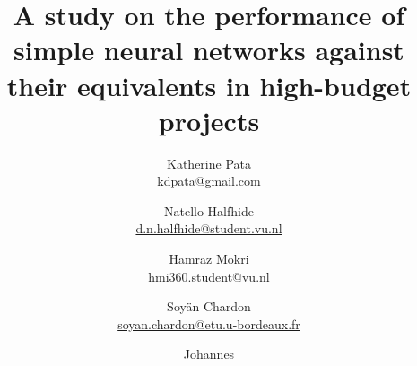 \documentclass[11pt, a4paper]{article}
\begin{document}
\title{A study on the performance of simple neural networks against their equivalents in high-budget projects}
\author{
  Katherine Pata \\ \href{mailto:kdpata@gmail.com}{kdpata@gmail.com}
  \and Natello Halfhide \\ \href{mailto:d.n.halfhide@student.vu.nl}{d.n.halfhide@student.vu.nl}
  \and Hamraz Mokri \\ \href{mailto:hmi360.student@vu.nl}{hmi360.student@vu.nl}
  \and Soyän Chardon \\ \href{mailto:soyan.chardon@etu.u-bordeaux.fr}{soyan.chardon@etu.u-bordeaux.fr}
  \and Johannes \\ \href{mailto:}{}
}
\maketitle

\newpage

\tableofcontents

\newpage
\restoregeometry

\twocolumn










\newpage
\onecolumn
\appendix
\end{document}
